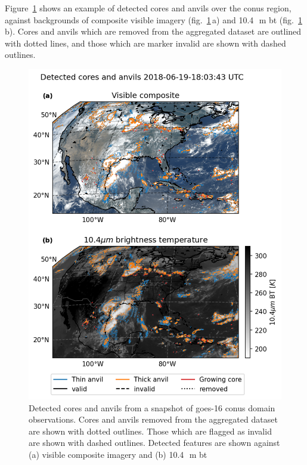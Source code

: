 Figure~\ref{fig:conus_detected_dccs} shows an example of detected cores and anvils over the \acrshort{conus} region, against backgrounds of composite visible imagery (fig.~\ref{fig:conus_detected_dccs}\,a) and 10.4\,\unit{\mu m} \acrshort{bt} (fig.~\ref{fig:conus_detected_dccs}\,b).
Cores and anvils which are removed from the aggregated dataset are outlined with dotted lines, and those which are marker invalid are shown with dashed outlines.

\begin{figure}[tp]
    \centering
    \includegraphics[width=\textwidth]{figures/ch2_02.png}
    \caption[
    Detected cores and anvils from a snapshot of \acrshort{goes}-16 \acrshort{conus} domain observations
    ]{
    Detected cores and anvils from a snapshot of \acrshort{goes}-16 \acrshort{conus} domain observations. Cores and anvils removed from the aggregated dataset are shown with dotted outlines. Those which are flagged as invalid are shown with dashed outlines. Detected features are shown against (a) visible composite imagery and (b) 10.4\,\unit{\mu m} \acrshort{bt}
    }
    \label{fig:conus_detected_dccs}
\end{figure}

